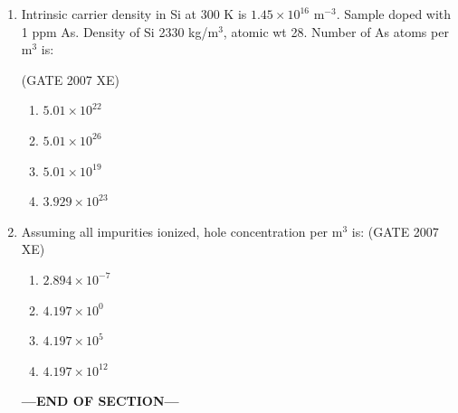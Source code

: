 \documentclass[journal,cmex10]{IEEEtran}
\theoremstyle{remark}
\numberwithin{equation}{enumi}
\numberwithin{figure}{enumi}
\begin{document}
\begin{enumerate}
\item  Intrinsic carrier density in Si at 300 K is $1.45 \times 10^{16}$ m$^{-3}$. Sample doped with 1 ppm As. Density of Si 2330 kg/m$^3$, atomic wt 28. Number of As atoms per m$^3$ is:  

\hfill{(GATE 2007 XE)}
\begin{multicols}{4}
\begin{enumerate}
    \item $5.01 \times 10^{22}$
    \item $5.01 \times 10^{26}$
    \item $5.01 \times 10^{19}$
    \item $3.929 \times 10^{23}$
\end{enumerate}
\end{multicols}


\item Assuming all impurities ionized, hole concentration per m$^3$ is:  
\hfill{(GATE 2007 XE)}
\begin{multicols}{2}
\begin{enumerate}
    \item $2.894 \times 10^{-7}$
    \item $4.197 \times 10^{0}$
    \item $4.197 \times 10^{5}$
    \item $4.197 \times 10^{12}$
\end{enumerate}
\end{multicols}

    \vspace{3\baselineskip}
    \begin{center}
    \textbf{\Large ---END OF SECTION---}
    \end{center}

\end{enumerate}
\end{document}
